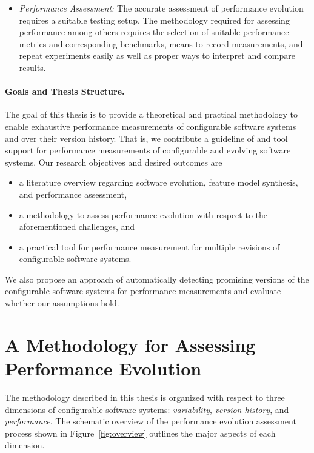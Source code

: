 \begin{itemize}
\item \emph{Performance Assessment:} The accurate assessment of
performance evolution requires a suitable testing setup. The methodology required for assessing performance
among others requires the selection of suitable performance metrics and
corresponding benchmarks, means to record measurements, and repeat experiments
easily as well as proper ways to interpret and compare results.
\end{itemize}

\paragraph{Goals and Thesis Structure.}
The goal of this thesis is to provide a theoretical and practical methodology to enable
exhaustive performance measurements of configurable software systems and over
their version history. That is, we contribute a guideline of and tool support
for performance measurements of configurable and evolving software systems. Our
research objectives and desired outcomes are

\begin{itemize}
\item a literature overview regarding software evolution, feature model
synthesis, and performance assessment,
\item a methodology to assess performance evolution with respect to the
aforementioned challenges, and
\item a practical tool for performance measurement for multiple revisions of
configurable software systems.
\end{itemize}

We also propose an approach of automatically detecting promising versions of the
configurable software systems for performance measurements and evaluate whether
our assumptions hold. \\


\section{A Methodology for Assessing Performance Evolution}
The methodology described in this thesis is organized with respect to three
dimensions of configurable software systems: \emph{variability}, \emph{version
history}, and \emph{performance}. The schematic overview of the performance
evolution assessment process shown in Figure~\ref{fig:overview} outlines the major aspects of each
dimension.

